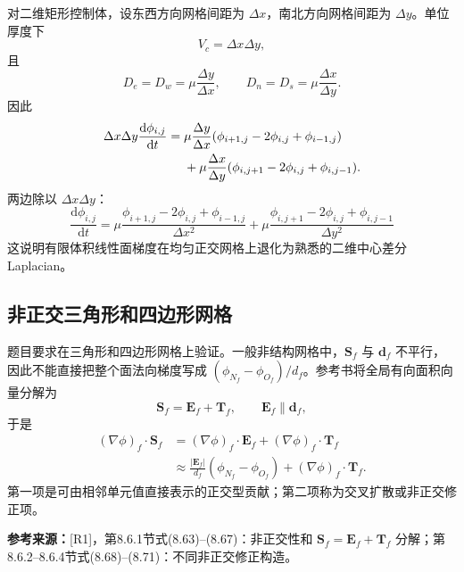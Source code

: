 \documentclass[UTF8,12pt,a4paper]{ctexart}
\numberwithin{equation}{section}
\newcommand{\Rone}{\textnormal{[R1]}}
\newcommand{\source}[1]{%
  \par\smallskip
  \noindent\colorbox{sourcebg}{%
    \parbox{0.955\linewidth}{\raggedright\footnotesize\color{sourcegray}\textbf{参考来源：}#1}%
  }
  \par\smallskip
}
\newcommand{\Sf}{\bm S}
\newcommand{\Ef}{\bm E}
\newcommand{\Tf}{\bm T}
\begin{document}
对二维矩形控制体，设东西方向网格间距为 $\Delta x$，南北方向网格间距为 $\Delta y$。单位厚度下
\begin{equation}
  V_c=\Delta x\Delta y,
  \label{eq:rect_volume}
\end{equation}
且
\begin{equation}
  D_e=D_w=\mu\frac{\Delta y}{\Delta x},
  \qquad
  D_n=D_s=\mu\frac{\Delta x}{\Delta y}.
  \label{eq:rect_D}
\end{equation}
因此
\begin{align}
  \Delta x\Delta y\frac{\mathrm d\phi_{i,j}}{\mathrm dt}
  ={}&\mu\frac{\Delta y}{\Delta x}
  (\phi_{i+1,j}-2\phi_{i,j}+\phi_{i-1,j})
  \notag\\
  &+\mu\frac{\Delta x}{\Delta y}
  (\phi_{i,j+1}-2\phi_{i,j}+\phi_{i,j-1}).
  \label{eq:rect_before_divide}
\end{align}
两边除以 $\Delta x\Delta y$：
\begin{equation}
  \boxed{
  \frac{\mathrm d\phi_{i,j}}{\mathrm dt}
  =\mu\frac{\phi_{i+1,j}-2\phi_{i,j}+\phi_{i-1,j}}{\Delta x^2}
  +\mu\frac{\phi_{i,j+1}-2\phi_{i,j}+\phi_{i,j-1}}{\Delta y^2}}
  \label{eq:rect_laplacian}
\end{equation}
这说明有限体积线性面梯度在均匀正交网格上退化为熟悉的二维中心差分Laplacian。

\subsection{非正交三角形和四边形网格}

题目要求在三角形和四边形网格上验证。一般非结构网格中，$\Sf_f$ 与
$\bm d_f$ 不平行，因此不能直接把整个面法向梯度写成
$(\phi_{N_f}-\phi_{O_f})/d_f$。参考书将全局有向面积向量分解为
\begin{equation}
  \boxed{\Sf_f=\Ef_f+\Tf_f},
  \qquad
  \Ef_f\parallel\bm d_f,
  \label{eq:nonorth_decomposition}
\end{equation}
于是
\begin{align}
  (\nabla\phi)_f\cdot\Sf_f
  &=(\nabla\phi)_f\cdot\Ef_f
    +(\nabla\phi)_f\cdot\Tf_f
    \label{eq:split_grad_1}\\
  &\approx
    \frac{|\Ef_f|}{d_f}(\phi_{N_f}-\phi_{O_f})
    +(\nabla\phi)_f\cdot\Tf_f.
    \label{eq:split_grad_2}
\end{align}
第一项是可由相邻单元值直接表示的正交型贡献；第二项称为交叉扩散或非正交修正项。

\source{\Rone，第8.6.1节式(8.63)--(8.67)：非正交性和 $\Sf_f=\Ef_f+\Tf_f$ 分解；第8.6.2--8.6.4节式(8.68)--(8.71)：不同非正交修正构造。}
\end{document}
